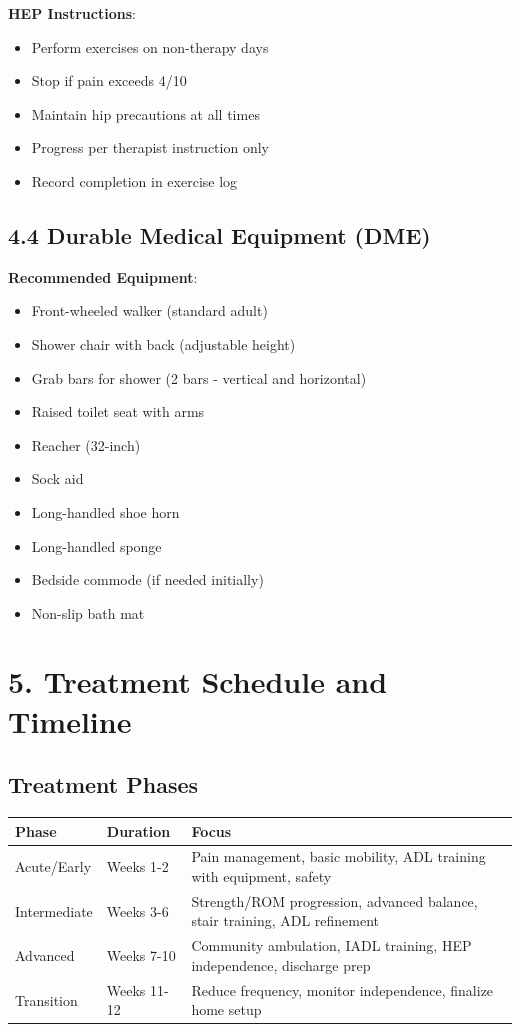 \documentclass[11pt,letterpaper]{article}
\begin{document}
\textbf{HEP Instructions}:
\begin{itemize}[leftmargin=*]
    \item Perform exercises on non-therapy days
    \item Stop if pain exceeds 4/10
    \item Maintain hip precautions at all times
    \item Progress per therapist instruction only
    \item Record completion in exercise log
\end{itemize}

\subsection*{4.4 Durable Medical Equipment (DME)}

\textbf{Recommended Equipment}:
\begin{itemize}[leftmargin=*]
    \item Front-wheeled walker (standard adult)
    \item Shower chair with back (adjustable height)
    \item Grab bars for shower (2 bars - vertical and horizontal)
    \item Raised toilet seat with arms
    \item Reacher (32-inch)
    \item Sock aid
    \item Long-handled shoe horn
    \item Long-handled sponge
    \item Bedside commode (if needed initially)
    \item Non-slip bath mat
\end{itemize}

\section*{5. Treatment Schedule and Timeline}

\subsection*{Treatment Phases}

\begin{tabularx}{\textwidth}{|l|l|X|}
\hline
\textbf{Phase} & \textbf{Duration} & \textbf{Focus} \\ \hline
Acute/Early & Weeks 1-2 & Pain management, basic mobility, ADL training with equipment, safety \\ \hline
Intermediate & Weeks 3-6 & Strength/ROM progression, advanced balance, stair training, ADL refinement \\ \hline
Advanced & Weeks 7-10 & Community ambulation, IADL training, HEP independence, discharge prep \\ \hline
Transition & Weeks 11-12 & Reduce frequency, monitor independence, finalize home setup \\ \hline
\end{tabularx}
\end{document}

